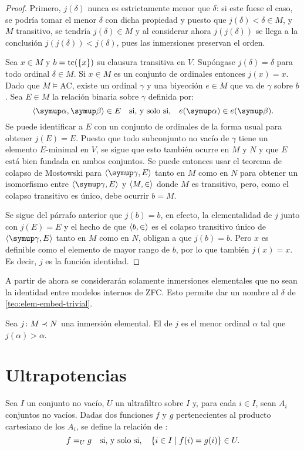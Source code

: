 \documentclass
[
  12pt,
  letterpaper,
  openany,
  oneside,
]{book}
\begin{document}
\begin{proof}
    Primero, $j(\delta)$ nunca es estrictamente menor que $\delta$:
    si este fuese el caso, se podría tomar el menor $\delta$ con dicha propiedad
    y puesto que $j(\delta) < \delta \in M$, y $M$ transitivo, se tendría
    $j(\delta)\in M$ y al considerar ahora $j(j(\delta))$ se llega a la conclusión
    $j(j(\delta)) < j(\delta)$, pues las inmersiones preservan el orden.

    Sea $x\in M$ y $b = \operatorname{tc}(\left\{ x \right\})$ su clausura transitiva en $V$.
    Supóngase $j(\delta) = \delta$ para todo ordinal $\delta\in M$.
    Si $x\in M$ es un conjunto de ordinales entonces $j(x)=x$.
    Dado que $M\models \text{AC}$, existe un ordinal $\gamma$ y
    una biyección $e\in M$ que va de $\gamma$ sobre $b$.
    Sea $E\in M$ la relación binaria sobre $\gamma$ definida por:
    \[
        \op{\alpha, \beta}\in E\quad\text{si, y solo si,}\quad e(\alpha)\in e(\beta).
    \]
    Se puede identificar a $E$ con un conjunto de ordinales de la forma usual
    para obtener $j(E)=E$. Puesto que todo subconjunto no vacío de $\gamma$
    tiene un elemento $E$-minimal en $V$, se sigue que esto también ocurre en $M$ y $N$
    y que $E$ está bien fundada en ambos conjuntos.
    Se puede entonces usar el teorema de colapso de Mostowski para $\op{\gamma, E}$
    tanto en $M$ como en $N$ para obtener un isomorfismo entre $\op{\gamma, E}$
    y $\langle M,\in \rangle$ donde $M$ es transitivo, pero, como el colapso transitivo
    es único, debe ocurrir $b = M$.

    Se sigue del párrafo anterior que $j(b)=b$, en efecto,
    la elementalidad de $j$ junto con $j(E)=E$ y el hecho de que
    $\langle b,\in \rangle$ es el colapso transitivo único de $\op{\gamma, E}$
    tanto en $M$ como en $N$, obligan a que $j(b)=b$.
    Pero $x$ es definible como el elemento de mayor rango de $b$, por lo que también
    $j(x) = x$. Es decir, $j$ es la función identidad.
\end{proof}

A partir de ahora
se considerarán solamente inmersiones elementales que no sean la identidad
entre modelos internos de ZFC.
Esto permite dar un nombre al $\delta$ de \ref{teo:elem-embed-trivial}.

\begin{defi}
    Sea $j\colon M\prec N$ una inmersión elemental. El  de $j$
    es el menor ordinal $\alpha$ tal que $j(\alpha)>\alpha$.
\end{defi}

\section{Ultrapotencias}
Sea $I$ un conjunto no vacío, $U$ un ultrafiltro sobre $I$ y, para cada $i\in I$,
sean $A_i$ conjuntos no vacíos. Dadas dos funciones $f$ y $g$ pertenecientes al producto
cartesiano de los $A_i$, se define la relación de :
\[
    f=_U g \quad\text{si, y solo si,}\quad \left\{ i\in I\mid f(i)=g(i) \right\}\in U.
\]
\end{document}
